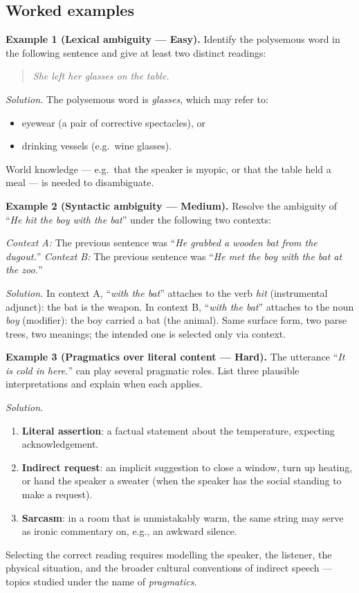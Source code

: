 \documentclass[12pt,a4paper]{report}
\theoremstyle{definition}
\theoremstyle{remark}
\begin{document}
\subsection{Worked examples}

\textbf{Example 1 (Lexical ambiguity --- Easy).}
Identify the polysemous word in the following sentence and give at least two distinct readings:
\begin{quote}
\emph{She left her glasses on the table.}
\end{quote}

\textit{Solution.} The polysemous word is \emph{glasses}, which may refer to:
\begin{itemize}
    \item eyewear (a pair of corrective spectacles), or
    \item drinking vessels (e.g.\ wine glasses).
\end{itemize}
World knowledge --- e.g.\ that the speaker is myopic, or that the table held a meal --- is needed to disambiguate.

\medskip

\textbf{Example 2 (Syntactic ambiguity --- Medium).}
Resolve the ambiguity of ``\emph{He hit the boy with the bat}'' under the following two contexts:

\textit{Context A:} The previous sentence was ``\emph{He grabbed a wooden bat from the dugout.}''
\textit{Context B:} The previous sentence was ``\emph{He met the boy with the bat at the zoo.}''

\textit{Solution.}
In context A, ``\emph{with the bat}'' attaches to the verb \emph{hit} (instrumental adjunct): the bat is the weapon.
In context B, ``\emph{with the bat}'' attaches to the noun \emph{boy} (modifier): the boy carried a bat (the animal). Same surface form, two parse trees, two meanings; the intended one is selected only via context.

\medskip

\textbf{Example 3 (Pragmatics over literal content --- Hard).}
The utterance ``\emph{It is cold in here.}'' can play several pragmatic roles. List three plausible interpretations and explain when each applies.

\textit{Solution.}
\begin{enumerate}
    \item \textbf{Literal assertion}: a factual statement about the temperature, expecting acknowledgement.
    \item \textbf{Indirect request}: an implicit suggestion to close a window, turn up heating, or hand the speaker a sweater (when the speaker has the social standing to make a request).
    \item \textbf{Sarcasm}: in a room that is unmistakably warm, the same string may serve as ironic commentary on, e.g., an awkward silence.
\end{enumerate}
Selecting the correct reading requires modelling the speaker, the listener, the physical situation, and the broader cultural conventions of indirect speech --- topics studied under the name of \emph{pragmatics}.
\end{document}
